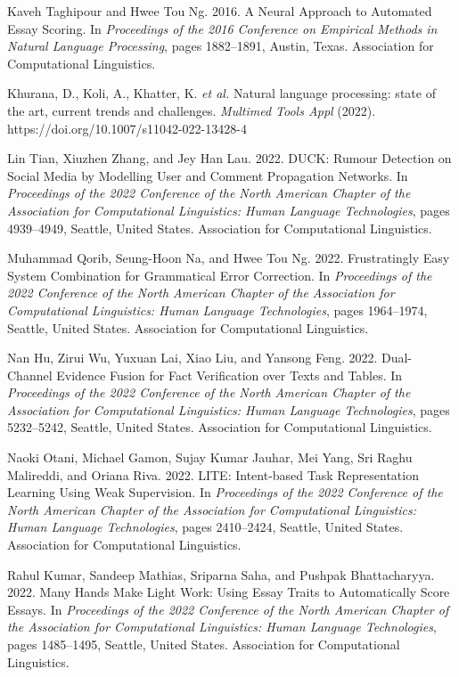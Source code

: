 \documentclass[11pt]{article}
\begin{document}
\begin{thebibliography}{50}
\bibitem{}
Kaveh Taghipour and Hwee Tou Ng. 2016. A Neural Approach to Automated Essay Scoring. In \emph{Proceedings of the 2016 Conference on Empirical Methods in Natural Language Processing}, pages 1882–1891, Austin, Texas. Association for Computational Linguistics.

\bibitem{}
Khurana, D., Koli, A., Khatter, K. \emph{et al.} Natural language processing: state of the art, current trends and challenges. \emph{Multimed Tools Appl} (2022). https://doi.org/10.1007/s11042-022-13428-4


\bibitem{}
Lin Tian, Xiuzhen Zhang, and Jey Han Lau. 2022. DUCK: Rumour Detection on Social Media by Modelling User and Comment Propagation Networks. In \emph{Proceedings of the 2022 Conference of the North American Chapter of the Association for Computational Linguistics: Human Language Technologies}, pages 4939–4949, Seattle, United States. Association for Computational Linguistics.

\bibitem{}
Muhammad Qorib, Seung-Hoon Na, and Hwee Tou Ng. 2022. Frustratingly Easy System Combination for Grammatical Error Correction. In \emph{Proceedings of the 2022 Conference of the North American Chapter of the Association for Computational Linguistics: Human Language Technologies}, pages 1964–1974, Seattle, United States. Association for Computational Linguistics.

\bibitem{}
Nan Hu, Zirui Wu, Yuxuan Lai, Xiao Liu, and Yansong Feng. 2022. Dual-Channel Evidence Fusion for Fact Verification over Texts and Tables. In \emph{Proceedings of the 2022 Conference of the North American Chapter of the Association for Computational Linguistics: Human Language Technologies}, pages 5232–5242, Seattle, United States. Association for Computational Linguistics.

\bibitem{}
Naoki Otani, Michael Gamon, Sujay Kumar Jauhar, Mei Yang, Sri Raghu Malireddi, and Oriana Riva. 2022. LITE: Intent-based Task Representation Learning Using Weak Supervision. In \emph{Proceedings of the 2022 Conference of the North American Chapter of the Association for Computational Linguistics: Human Language Technologies}, pages 2410–2424, Seattle, United States. Association for Computational Linguistics.

\bibitem{}
Rahul Kumar, Sandeep Mathias, Sriparna Saha, and Pushpak Bhattacharyya. 2022. Many Hands Make Light Work: Using Essay Traits to Automatically Score Essays. In \emph{Proceedings of the 2022 Conference of the North American Chapter of the Association for Computational Linguistics: Human Language Technologies}, pages 1485–1495, Seattle, United States. Association for Computational Linguistics.


\end{thebibliography}
\end{document}
